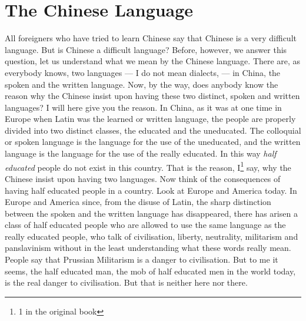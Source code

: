 \chapter{The Chinese Language}
All foreigners who have tried to learn Chinese say that Chinese is a very difficult language.
But is Chinese a difficult language?
Before, however, we answer this question, let us understand what we mean by the Chinese language.
There are, as everybody knows, two languages --- I do not mean dialects, --- in China, the spoken and the written language.
Now, by the way, does anybody know the reason why the Chinese insist upon having these two distinct, spoken and written languages?
I will here give you the reason.
In China, as it was at one time in Europe when Latin was the learned or written language, the people are properly divided into two distinct classes, the educated and the uneducated.
The colloquial or spoken language is the language for the use of the uneducated, and the written language is the language for the use of the really educated.
In this way \emph{half educated} people do not exist in this country.
That is the reason, I\footnote{1 in the original book} say, why the Chinese insist upon having two languages.
Now think of the consequences of having half educated people in a country.
Look at Europe and America today.
In Europe and America since, from the disuse of Latin, the sharp distinction between the spoken and the written language has disappeared, there has arisen a class of half educated people who are allowed to use the same language as the really educated people, who talk of civilisation, liberty, neutrality, militarism and panslavinism without in the least understanding what these words really mean.
People say that Prussian Militarism is a danger to civilisation.
But to me it seems, the half educated man, the mob of half educated men in the world today, is the real danger to civilisation.
But that is neither here nor there.

